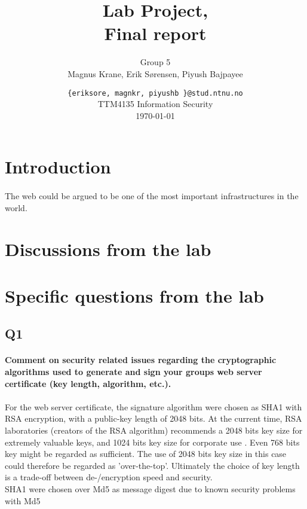 \documentclass[a4paper,11pt]{article}
\title{Lab Project,\\Final report}
\author{Group 5 \\Magnus Krane, Erik S\o rensen, Piyush Bajpayee}
\date{ {\tt \{eriksore, magnkr, piyushb \}@stud.ntnu.no}\\
TTM4135 Information Security\\
\today}
\begin{document}
\maketitle
\vspace{3cm}

\begin{abstract}

\end{abstract}
\section*{Introduction}
\paragraph{}The web could be argued to be one of the most important infrastructures in the world.
\section{Discussions from the lab}
\paragraph{}
\section{Specific questions from the lab}
\subsection{Q1}
\paragraph{Comment on security related issues regarding the cryptographic algorithms used to
generate and sign your groups web server certiﬁcate (key length, algorithm, etc.).}
\paragraph{} For the web server certificate, the signature algorithm were chosen as SHA1 with RSA encryption, with a public-key length of 2048 bits. At the current time, RSA laboratories (creators of the RSA algorithm) recommends a 2048 bits key size for extremely valuable keys, and 1024 bits key size for corporate use \cite{2}. Even 768 bits key might be regarded as sufficient. The use of 2048 bits key size in this case could therefore be regarded as 'over-the-top'. Ultimately the choice of key length is a trade-off between de-/encryption speed and security.\\
SHA1 were chosen over Md5 as message digest due to known security problems with Md5
\end{document}
